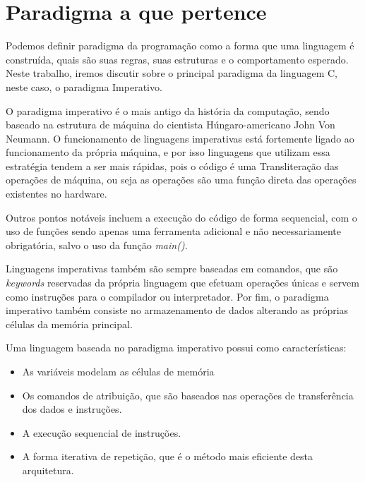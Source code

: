 \chapter{Paradigma a que pertence}


Podemos definir paradigma da programação como a forma que uma linguagem é construída,
 quais são suas regras, suas estruturas e o comportamento esperado. Neste trabalho,
  iremos discutir sobre o principal paradigma da linguagem C, neste caso, o paradigma Imperativo.

O paradigma imperativo é o mais antigo da história da computação, sendo baseado na estrutura de máquina 
do cientista Húngaro-americano John Von Neumann. O funcionamento de linguagens imperativas está fortemente
 ligado ao funcionamento da própria máquina, e por isso linguagens que utilizam essa estratégia tendem a ser mais rápidas, 
 pois o código é uma Transliteração das operações de máquina, ou seja as operações são uma função direta das operações existentes no hardware.  

Outros pontos notáveis incluem a execução do código de forma sequencial, com o uso de funções sendo apenas uma ferramenta adicional
e não necessariamente obrigatória, salvo o uso da função \emph{main()}.

Linguagens imperativas também são sempre baseadas em comandos, que são \emph{keywords} 
reservadas da própria linguagem que efetuam operações únicas e servem como instruções para o compilador ou interpretador.
Por fim, o paradigma imperativo também consiste no armazenamento de dados alterando as próprias células da memória principal.


Uma linguagem baseada no paradigma imperativo possui como características:

\begin{itemize}
    \item As variáveis  modelam as células de memória
    \item Os comandos de atribuição, que são baseados nas operações de
    transferência dos dados e instruções.
    \item A execução sequencial de instruções.
    \item A forma iterativa de repetição, que é o método mais eficiente desta arquitetura.

\end{itemize}

\newpage